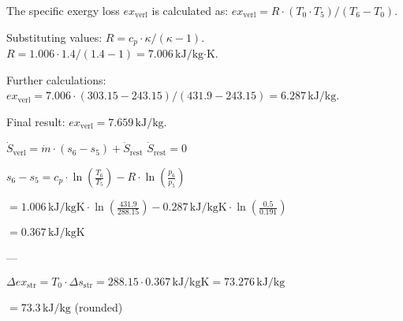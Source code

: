 The specific exergy loss \( ex_{\text{verl}} \) is calculated as:  
\( ex_{\text{verl}} = R \cdot \left( T_0 \cdot T_5 \right) / \left( T_6 - T_0 \right) \).  

Substituting values:  
\( R = c_p \cdot \kappa / (\kappa - 1) \).  
\( R = 1.006 \cdot 1.4 / (1.4 - 1) = 7.006 \, \text{kJ/kg·K} \).  

Further calculations:  
\( ex_{\text{verl}} = 7.006 \cdot \left( 303.15 - 243.15 \right) / \left( 431.9 - 243.15 \right) = 6.287 \, \text{kJ/kg} \).  

Final result:  
\( ex_{\text{verl}} = 7.659 \, \text{kJ/kg} \).

\( \dot{S}_{\text{verl}} = \dot{m} \cdot \left( s_6 - s_5 \right) + \dot{S}_{\text{rest}} \)  
\( \dot{S}_{\text{rest}} = 0 \)  

\( s_6 - s_5 = c_p \cdot \ln \left( \frac{T_6}{T_5} \right) - R \cdot \ln \left( \frac{p_6}{p_5} \right) \)  

\( = 1.006 \, \text{kJ/kgK} \cdot \ln \left( \frac{431.9}{288.15} \right) - 0.287 \, \text{kJ/kgK} \cdot \ln \left( \frac{0.5}{0.191} \right) \)  

\( = 0.367 \, \text{kJ/kgK} \)  

---

\( \Delta ex_{\text{str}} = T_0 \cdot \Delta s_{\text{str}} = 288.15 \cdot 0.367 \, \text{kJ/kgK} = 73.276 \, \text{kJ/kg} \)  

\( = 73.3 \, \text{kJ/kg} \) (rounded)